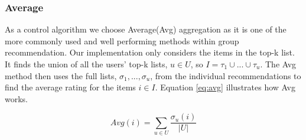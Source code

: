 \subsubsection{Average}\label{sec:average}
As a control algorithm we choose Average(Avg) aggregation as it is one of the more commonly used and well performing methods within group recommendation\cite{recbook:average}. Our implementation only considers the items in the top-k list. It finds the union of all the users' top-k lists, $u \in U$, so $I = \tau_1 \cup ... \cup \tau_u$. The Avg method then uses the full lists, $\sigma_1, ..., \sigma_u$, from the individual recommendations to find the average rating for the items $i \in I$. Equation \ref{eq:avg} illustrates how Avg works.

\begin{equation}\label{eq:avg}
Avg(i) = \sum_{u \in U}\frac{\sigma_u(i)}{|U|} 
\end{equation}